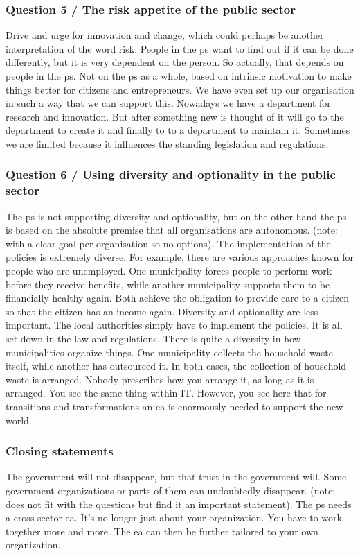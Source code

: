 \subsubsection{Question 5 / The risk appetite of the public sector}
Drive and urge for innovation and change, which could perhaps be another interpretation of the word risk. People in the \gls{ps} want to find out if it can be done differently, but it is very dependent on the person. So actually, that depends on people in the \gls{ps}. Not on the \gls{ps} as a whole, based on intrinsic motivation to make things better for citizens and entrepreneurs. We have even set up our organisation in such a way that we can support this. Nowadays we have a department for research and innovation. But after something new is thought of it will go to the department to create it and finally to to a department to maintain it. Sometimes we are limited because it influences the standing legislation and regulations.
\subsubsection{Question 6 / Using diversity and optionality in the public sector}
The \gls{ps} is not supporting diversity and optionality, but on the other hand the \gls{ps} is based on the absolute premise that all organisations are autonomous. (note: with a clear goal per organisation so no options). The implementation of the policies is extremely diverse. For example, there are various approaches known for people who are unemployed. One municipality forces people to perform work before they receive benefits, while another municipality supports them to be financially healthy again. Both achieve the obligation to provide care to a citizen so that the citizen has an income again. Diversity and optionality are less important. The local authorities simply have to implement the policies. It is all set down in the law and regulations. There is quite a diversity in how municipalities organize things. One municipality collects the household waste itself, while another has outsourced it. In both cases, the collection of household waste is arranged. Nobody prescribes how you arrange it, as long as it is arranged. You see the same thing within IT. However, you see here that for transitions and transformations an \acrshort{ea} is enormously needed to support the new world.
\subsubsection{Closing statements}
The government will not disappear, but that trust in the government will. Some government organizations or parts of them can undoubtedly disappear. (note: does not fit with the questions but find it an important statement).
The \gls{ps} needs a cross-sector \acrshort{ea}. It's no longer just about your organization. You have to work together more and more. The \acrshort{ea} can then be further tailored to your own organization.
